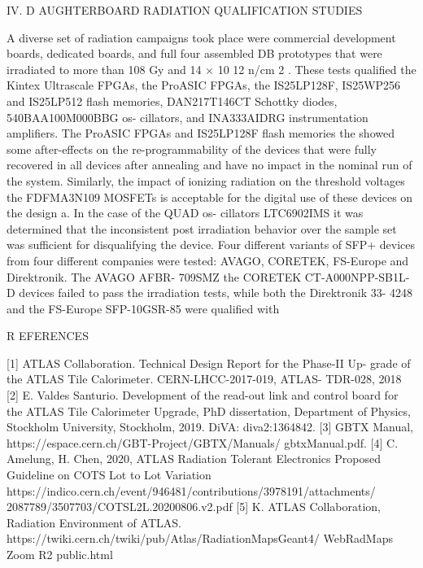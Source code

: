 \documentclass{article}
\begin{document}
IV.   D AUGHTERBOARD   RADIATION   QUALIFICATION 
STUDIES

A   diverse   set   of   radiation   campaigns   took   place   were 
commercial   development   boards,   dedicated   boards,   and   full 
four   assembled   DB   prototypes   that   were   irradiated   to   more 
than   108   Gy   and   14   $\times$   10 12   n/cm 2 .   These   tests   qualified 
the   Kintex   Ultrascale   FPGAs,   the   ProASIC   FPGAs,   the 
IS25LP128F,   IS25WP256   and   IS25LP512   flash   memories, 
DAN217T146CT Schottky diodes, 540BAA100M000BBG os- 
cillators,   and   INA333AIDRG   instrumentation   amplifiers.   The 
ProASIC FPGAs and IS25LP128F flash memories the showed 
some   after-effects   on   the   re-programmability   of   the   devices 
that   were   fully   recovered   in   all   devices   after   annealing   and 
have   no   impact   in   the   nominal   run   of   the   system.   Similarly, 
the   impact   of   ionizing   radiation   on   the   threshold   voltages   the 
FDFMA3N109   MOSFETs   is   acceptable   for   the   digital   use   of 
these   devices   on   the   design   a.   In   the   case   of   the   QUAD   os- 
cillators   LTC6902IMS   it   was   determined   that   the   inconsistent 
post   irradiation   behavior   over   the   sample   set   was   sufficient 
for   disqualifying   the   device.   Four   different   variants   of   SFP+ 
devices   from   four   different   companies   were   tested:   AVAGO, 
CORETEK,   FS-Europe   and   Direktronik.   The   AVAGO   AFBR- 
709SMZ the CORETEK CT-A000NPP-SB1L-D devices failed 
to   pass   the   irradiation   tests,   while   both   the   Direktronik   33- 
4248   and   the   FS-Europe   SFP-10GSR-85   were   qualified   with

R EFERENCES

[1]   ATLAS   Collaboration.   Technical   Design   Report   for   the   Phase-II   Up- 
grade of the ATLAS Tile Calorimeter. CERN-LHCC-2017-019, ATLAS- 
TDR-028,   2018 
[2]   E.   Valdes   Santurio.   Development   of   the   read-out   link   and   control 
board   for   the   ATLAS   Tile   Calorimeter   Upgrade,   PhD   dissertation, 
Department   of   Physics,   Stockholm   University,   Stockholm,   2019.   DiVA: 
diva2:1364842. 
[3]   GBTX 
Manual, 
https://espace.cern.ch/GBT-Project/GBTX/Manuals/ 
gbtxManual.pdf. 
[4]   C. 
Amelung, 
H. 
Chen, 
2020, 
ATLAS 
Radiation 
Tolerant 
Electronics   Proposed   Guideline   on   COTS   Lot   to   Lot   Variation 
https://indico.cern.ch/event/946481/contributions/3978191/attachments/ 
2087789/3507703/COTSL2L.20200806.v2.pdf 
[5]   K. 
ATLAS 
Collaboration, 
Radiation 
Environment 
of 
ATLAS. 
https://twiki.cern.ch/twiki/pub/Atlas/RadiationMapsGeant4/ 
WebRadMaps   Zoom   R2   public.html
\end{document}
